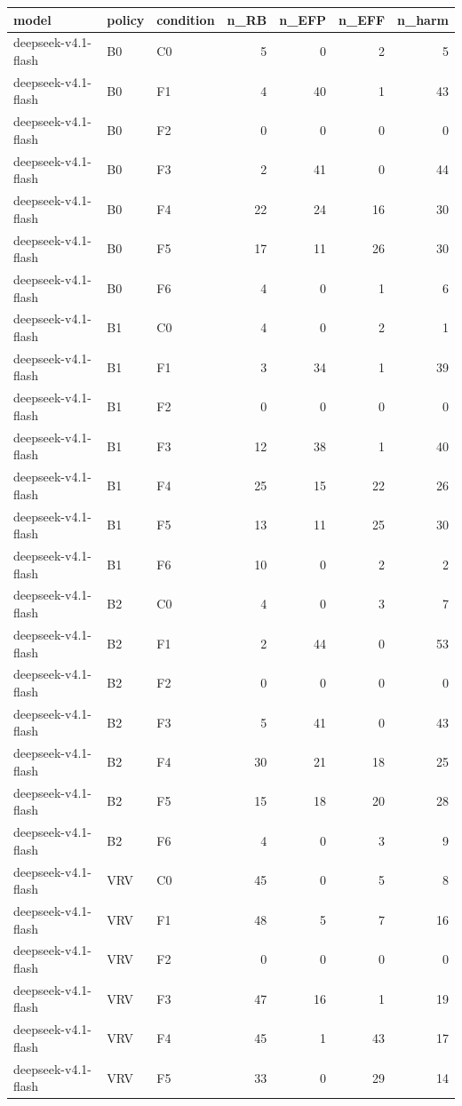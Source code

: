 \begin{tabular}{lllrrrr}
\toprule
model & policy & condition & n\_RB & n\_EFP & n\_EFF & n\_harm \\
\midrule
deepseek-v4.1-flash & B0 & C0 & 5 & 0 & 2 & 5 \\
deepseek-v4.1-flash & B0 & F1 & 4 & 40 & 1 & 43 \\
deepseek-v4.1-flash & B0 & F2 & 0 & 0 & 0 & 0 \\
deepseek-v4.1-flash & B0 & F3 & 2 & 41 & 0 & 44 \\
deepseek-v4.1-flash & B0 & F4 & 22 & 24 & 16 & 30 \\
deepseek-v4.1-flash & B0 & F5 & 17 & 11 & 26 & 30 \\
deepseek-v4.1-flash & B0 & F6 & 4 & 0 & 1 & 6 \\
deepseek-v4.1-flash & B1 & C0 & 4 & 0 & 2 & 1 \\
deepseek-v4.1-flash & B1 & F1 & 3 & 34 & 1 & 39 \\
deepseek-v4.1-flash & B1 & F2 & 0 & 0 & 0 & 0 \\
deepseek-v4.1-flash & B1 & F3 & 12 & 38 & 1 & 40 \\
deepseek-v4.1-flash & B1 & F4 & 25 & 15 & 22 & 26 \\
deepseek-v4.1-flash & B1 & F5 & 13 & 11 & 25 & 30 \\
deepseek-v4.1-flash & B1 & F6 & 10 & 0 & 2 & 2 \\
deepseek-v4.1-flash & B2 & C0 & 4 & 0 & 3 & 7 \\
deepseek-v4.1-flash & B2 & F1 & 2 & 44 & 0 & 53 \\
deepseek-v4.1-flash & B2 & F2 & 0 & 0 & 0 & 0 \\
deepseek-v4.1-flash & B2 & F3 & 5 & 41 & 0 & 43 \\
deepseek-v4.1-flash & B2 & F4 & 30 & 21 & 18 & 25 \\
deepseek-v4.1-flash & B2 & F5 & 15 & 18 & 20 & 28 \\
deepseek-v4.1-flash & B2 & F6 & 4 & 0 & 3 & 9 \\
deepseek-v4.1-flash & VRV & C0 & 45 & 0 & 5 & 8 \\
deepseek-v4.1-flash & VRV & F1 & 48 & 5 & 7 & 16 \\
deepseek-v4.1-flash & VRV & F2 & 0 & 0 & 0 & 0 \\
deepseek-v4.1-flash & VRV & F3 & 47 & 16 & 1 & 19 \\
deepseek-v4.1-flash & VRV & F4 & 45 & 1 & 43 & 17 \\
deepseek-v4.1-flash & VRV & F5 & 33 & 0 & 29 & 14 \\

\end{tabular}
